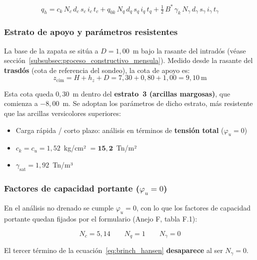 \begin{equation}
  q_h = c_k\,N_c\,d_c\,s_c\,i_c\,t_c
       + q_{0k}\,N_q\,d_q\,s_q\,i_q\,t_q
       + \tfrac{1}{2}\,B^*\,\gamma_k\,N_\gamma\,d_\gamma\,s_\gamma\,i_\gamma\,t_\gamma
  \label{eq:brinch_hansen}
\end{equation}

\subsubsection{Estrato de apoyo y parámetros resistentes}

La base de la zapata se sitúa a $D = 1{,}00$~m bajo la rasante del intradós
(véase sección~\ref{subsubsec:proceso_constructivo_mensula}).
Medido desde la rasante del \textbf{trasdós} (cota de referencia del sondeo),
la cota de apoyo es:
\[
  z_\text{cim} = H + h_z + D = 7{,}30 + 0{,}80 + 1{,}00 = 9{,}10~\text{m}
\]

Esta cota queda $0{,}30$~m dentro del \textbf{estrato~3 (arcillas margosas)},
que comienza a $-8{,}00$~m. Se adoptan los parámetros de dicho estrato, más
resistente que las arcillas versicolores superiores:

\begin{supuestobox}
  \begin{itemize}
    \item Carga rápida / corto plazo: análisis en términos de \textbf{tensión total}
          ($\varphi_u = 0$)
    \item $c_k = c_u = 1{,}52$~kg/cm² $= \mathbf{15{,}2}$~Tn/m²
    \item $\gamma_\text{sat} = 1{,}92$~Tn/m³
  \end{itemize}
\end{supuestobox}

\subsubsection{Factores de capacidad portante ($\varphi_u = 0$)}

En el análisis no drenado se cumple $\varphi_u = 0$, con lo que los factores de
capacidad portante quedan fijados por el formulario (Anejo F, tabla F.1):

\begin{equation*}
  N_c = 5{,}14 \qquad N_q = 1 \qquad N_\gamma = 0
\end{equation*}

El tercer término de la ecuación~\eqref{eq:brinch_hansen} \textbf{desaparece} al
ser $N_\gamma = 0$.

